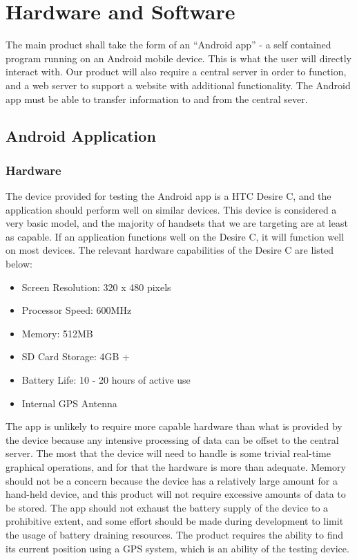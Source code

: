 \section{Hardware and Software}
	The main product shall take the form of an ``Android app'' - a self 
	contained program running on an Android mobile device. This is what the 
	user will directly interact with. Our product will also require a central 
	server in order to function, and a web server to support a website with
	additional functionality. The Android app must be able to transfer 
	information to and from the central sever.
	\subsection{Android Application}
		\subsubsection{Hardware}
			The device provided for testing the Android app is a HTC Desire C, 
			and the application should perform well on similar devices. This
			device is considered a very basic model, and the majority of
			handsets that we are targeting are at least as capable. If an
			application functions well on the Desire C, it will function well
			on most devices. The relevant hardware capabilities of the Desire C
			are listed below\cite{htcdesirex}:

			\begin{itemize}
				\item Screen Resolution: 320 x 480 pixels
				\item Processor Speed: 600MHz
				\item Memory: 512MB
				\item SD Card Storage: 4GB +
				\item Battery Life: 10 - 20 hours of active use
				\item Internal GPS Antenna
			\end{itemize}

			\noindent
			The app is unlikely to require more capable hardware than what is 
			provided by the device because any intensive processing of data 
			can be offset to the central server. The most that the device will 
			need to handle is some trivial real-time graphical operations, and 
			for that the hardware is more than adequate. Memory should not be 
			a concern because the device has a relatively large amount for a 
			hand-held device, and this product will not require excessive 
			amounts of data to be stored. The app should not exhaust the 
			battery supply of the device to a prohibitive extent, and some 
			effort should be made during development to limit the usage of 
			battery draining resources. The product requires the ability to 
			find its current position using a GPS system, which is an ability 
			of the testing device. 
